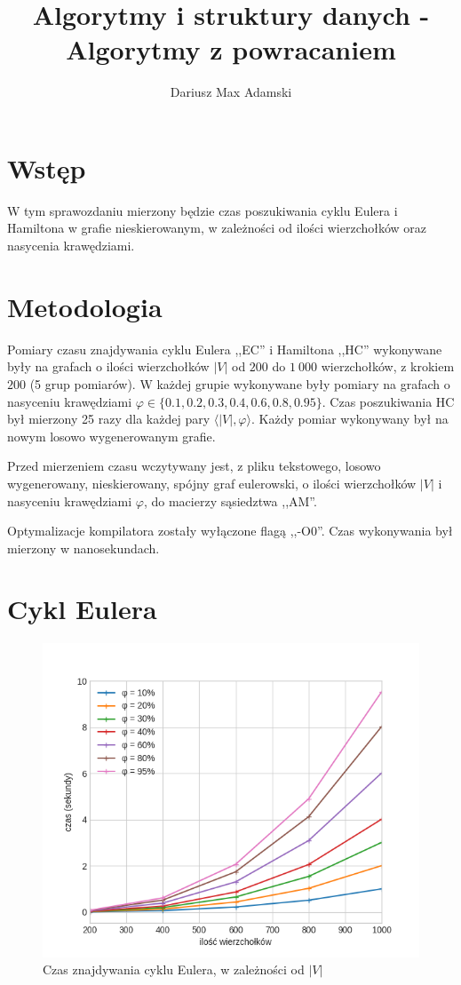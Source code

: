 \documentclass[11pt,twocolumn]{article}
\title{Algorytmy i struktury danych - Algorytmy z powracaniem}
\author{Dariusz Max Adamski}
\date{}
\begin{document}
\maketitle


\section*{Wstęp}

W tym sprawozdaniu mierzony będzie czas poszukiwania
cyklu Eulera i Hamiltona w grafie nieskierowanym,
w zależności od ilości wierzchołków oraz nasycenia krawędziami.


\section*{Metodologia}

Pomiary czasu znajdywania cyklu Eulera ,,EC'' i Hamiltona ,,HC'' wykonywane były na grafach
o ilości wierzchołków $|V|$ od $200$ do $1\ 000$ wierzchołków, z krokiem $200$ (5 grup pomiarów).
W każdej grupie wykonywane były pomiary na grafach o nasyceniu krawędziami
$\varphi \in \{0.1, 0.2, 0.3, 0.4, 0.6, 0.8, 0.95\}$.
Czas poszukiwania HC był mierzony 25 razy dla każdej pary $\langle |V|, \varphi \rangle$.
Każdy pomiar wykonywany był na nowym losowo wygenerowanym grafie.

Przed mierzeniem czasu wczytywany jest, z pliku tekstowego,
losowo wygenerowany, nieskierowany, spójny graf eulerowski,
o ilości wierzchołków $|V|$  i nasyceniu krawędziami $\varphi$,
do macierzy sąsiedztwa ,,AM''.

Optymalizacje kompilatora zostały wyłączone flagą ,,-O0''. 
Czas wykonywania był mierzony w nanosekundach.


\section{Cykl Eulera}

\begin{figure}[h]
	\includegraphics[width=\linewidth]{euler.png}
	\caption{Czas znajdywania cyklu Eulera, w zależności od $|V|$ \label{euler}}
\end{figure}
\end{document}
